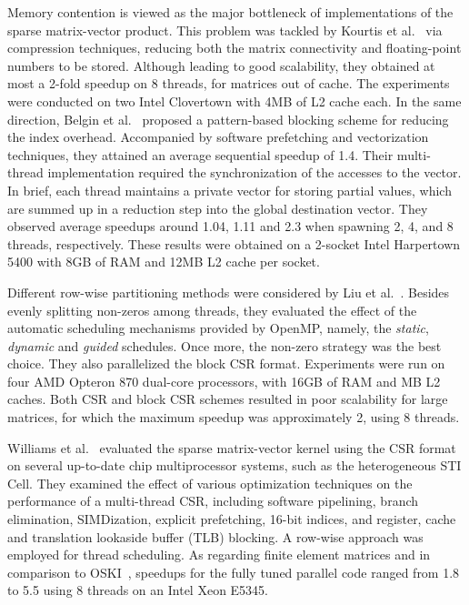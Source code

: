 \documentclass[11pt]{article}
\begin{document}
Memory contention is viewed as the major bottleneck of implementations of the
sparse matrix-vector product. This problem was tackled by Kourtis et al.~\cite{KGK08a} via
compression techniques, reducing both the matrix connectivity and
floating-point numbers to be stored.  Although leading to good scalability,
they obtained at most a 2-fold speedup on 8 threads, for matrices out of cache.
The experiments were conducted on two Intel Clovertown with 4MB of L2
cache each.  In the same direction, Belgin et al.~\cite{BBR09a} proposed a
pattern-based blocking scheme for reducing the index overhead.
Accompanied by software prefetching and vectorization techniques, they attained
an average sequential speedup of 1.4.  Their multi-thread implementation required the
synchronization of the accesses to the  vector. In brief, each thread
maintains a private vector for storing partial values, which are summed up in a
reduction step into the global destination vector.  They observed average
speedups around 1.04, 1.11 and 2.3 when spawning 2, 4, and 8 threads,
respectively.  These results were obtained on a 2-socket Intel Harpertown 5400
with 8GB of RAM and 12MB L2 cache per socket.

Different row-wise partitioning methods were considered by Liu et al.~\cite{LZSQ09a}.
Besides evenly splitting non-zeros among threads, they evaluated
the effect of the automatic scheduling mechanisms provided by OpenMP, namely,
the \textit{static}, \textit{dynamic} and \textit{guided} schedules.  Once
more, the non-zero strategy was the best choice.  They also
parallelized the block CSR format.  Experiments were run on four AMD Opteron 870
dual-core processors, with 16GB of RAM and MB L2 caches.  Both
CSR and block CSR schemes resulted in poor scalability for large matrices,
for which the maximum speedup was approximately 2, using 8 threads.

Williams et al.~\cite{WOVSYD09a} evaluated the sparse matrix-vector kernel using the CSR
format on several up-to-date chip multiprocessor systems, such as the
heterogeneous STI Cell.  They examined the effect of various optimization techniques
on the performance of a multi-thread CSR, including software
pipelining, branch elimination, SIMDization, explicit prefetching, 16-bit
indices, and register, cache and translation lookaside buffer (TLB) blocking.
A row-wise approach was employed for
thread scheduling.  As regarding finite element matrices and in comparison to OSKI~\cite{VDY05a},
speedups for the fully tuned parallel code ranged
from 1.8 to 5.5 using 8 threads on an Intel Xeon E5345.
\end{document}
